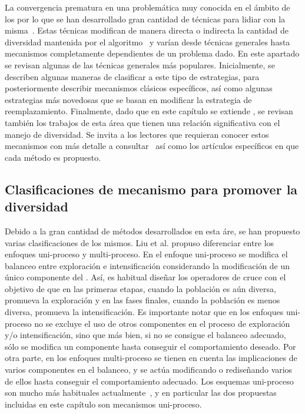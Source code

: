La convergencia prematura en una problemática muy conocida en el ámbito de los \EAS{} por lo que se han desarrollado gran cantidad de técnicas 
para lidiar con la misma~\cite{pandey2014comparative}.
%
Estas técnicas modifican de manera directa o indirecta la cantidad de diversidad mantenida por el algoritmo~\cite{Joel:Crepinsek}
y varían desde técnicas generales hasta mecanismos completamente dependientes de un problema dado.
%
En este apartado se revisan algunas de las técnicas generales más populares.
%
Inicialmente, se describen algunas maneras de clasificar a este tipo de estrategias, para posteriormente
describir mecanismos clásicos específicos, así como algunas estrategias más novedosas que se basan en modificar
la estrategia de reemplazamiento.
%
Finalmente, dado que en este capítulo se extiende \DE{}, se revisan también los trabajos de esta área que tienen una relación
significativa con el manejo de diversidad.
%
Se invita a los lectores que requieran conocer estos mecanismos con más detalle a consultar~\cite{Joel:Crepinsek} así como los artículos
específicos en que cada método es propuesto.

\subsection{Clasificaciones de mecanismo para promover la diversidad}

Debido a la gran cantidad de métodos desarrollados en esta áre, se han propuesto varias clasificaciones de los mismos.
%
Liu et al.\cite{liu2009explore} propuso diferenciar entre los enfoques uni-proceso y multi-proceso.
%
En el enfoque uni-proceso se modifica el balanceo entre exploración e intensificación considerando la modificación de un único componente del \EA{}. 
%
Así, es habitual diseñar los operadores de cruce con el objetivo de que en las primeras etapas, cuando la población es aún diversa, promueva la exploración
y en las fases finales, cuando la población es menos diversa, promueva la intensificación.
%
Es importante notar que en los enfoques uni-proceso no se excluye el uso de otros componentes en el proceso de exploración y/o intensificación, 
sino que más bien, si no se consigue el balanceo adecuado, sólo se modifica un componente hasta conseguir el comportamiento deseado.
%
Por otra parte, en los enfoques multi-proceso se tienen en cuenta las implicaciones de varios componentes en el balanceo, y se actúa modificando o rediseñando varios de ellos
hasta conseguir el comportamiento adecuado.
%
Los esquemas uni-proceso son mucho más habituales actualmente~\cite{Crepinsek:13}, y en particular las dos propuestas incluidas en este capítulo son mecanismos
uni-proceso.


